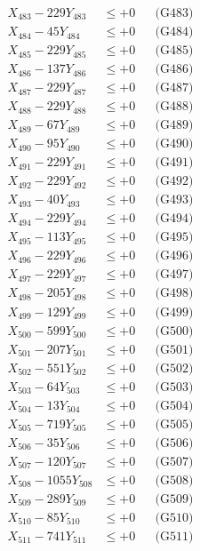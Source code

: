 \documentclass[a4paper,10pt]{article}
\begin{document}
{\begin{align}
X_{483} - 229Y_{483} &\leq +0 && \text{(G483)} \\
X_{484} - 45Y_{484} &\leq +0 && \text{(G484)} \\
X_{485} - 229Y_{485} &\leq +0 && \text{(G485)} \\
X_{486} - 137Y_{486} &\leq +0 && \text{(G486)} \\
X_{487} - 229Y_{487} &\leq +0 && \text{(G487)} \\
X_{488} - 229Y_{488} &\leq +0 && \text{(G488)} \\
X_{489} - 67Y_{489} &\leq +0 && \text{(G489)} \\
X_{490} - 95Y_{490} &\leq +0 && \text{(G490)} \\
\allowbreak
X_{491} - 229Y_{491} &\leq +0 && \text{(G491)} \\
X_{492} - 229Y_{492} &\leq +0 && \text{(G492)} \\
X_{493} - 40Y_{493} &\leq +0 && \text{(G493)} \\
X_{494} - 229Y_{494} &\leq +0 && \text{(G494)} \\
X_{495} - 113Y_{495} &\leq +0 && \text{(G495)} \\
X_{496} - 229Y_{496} &\leq +0 && \text{(G496)} \\
X_{497} - 229Y_{497} &\leq +0 && \text{(G497)} \\
X_{498} - 205Y_{498} &\leq +0 && \text{(G498)} \\
X_{499} - 129Y_{499} &\leq +0 && \text{(G499)} \\
X_{500} - 599Y_{500} &\leq +0 && \text{(G500)} \\
\allowbreak
X_{501} - 207Y_{501} &\leq +0 && \text{(G501)} \\
X_{502} - 551Y_{502} &\leq +0 && \text{(G502)} \\
X_{503} - 64Y_{503} &\leq +0 && \text{(G503)} \\
X_{504} - 13Y_{504} &\leq +0 && \text{(G504)} \\
X_{505} - 719Y_{505} &\leq +0 && \text{(G505)} \\
X_{506} - 35Y_{506} &\leq +0 && \text{(G506)} \\
X_{507} - 120Y_{507} &\leq +0 && \text{(G507)} \\
X_{508} - 1055Y_{508} &\leq +0 && \text{(G508)} \\
X_{509} - 289Y_{509} &\leq +0 && \text{(G509)} \\
X_{510} - 85Y_{510} &\leq +0 && \text{(G510)} \\
\allowbreak
X_{511} - 741Y_{511} &\leq +0 && \text{(G511)} \\

\end{align}}
\end{document}
